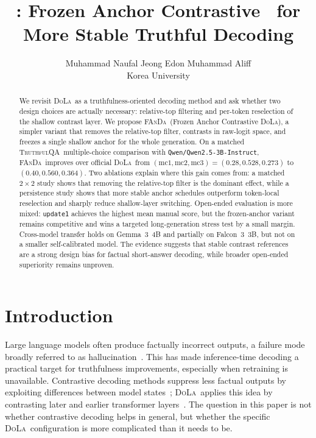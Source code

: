 \documentclass[10pt,twocolumn,letterpaper]{article}
\title{\fanda: Frozen Anchor Contrastive \dola\ for More Stable Truthful Decoding}
\author{Muhammad Naufal \quad Jeong Edon \quad Muhammad Aliff\\
Korea University
}
\newcommand{\fanda}{\textsc{FAnDa}}
\newcommand{\dola}{\textsc{DoLa}}
\newcommand{\truthfulqa}{\textsc{TruthfulQA}}
\begin{document}
\maketitle

\begin{abstract}
We revisit \dola\ as a truthfulness-oriented decoding method and ask whether two design choices are actually necessary: relative-top filtering and per-token reselection of the shallow contrast layer. We propose \fanda\ (Frozen Anchor Contrastive \dola), a simpler variant that removes the relative-top filter, contrasts in raw-logit space, and freezes a single shallow anchor for the whole generation. On a matched \truthfulqa\ multiple-choice comparison with \texttt{Qwen/Qwen2.5-3B-Instruct}, \fanda\ improves over official \dola\ from $(\mathrm{mc1}, \mathrm{mc2}, \mathrm{mc3}) = (0.28, 0.528, 0.273)$ to $(0.40, 0.560, 0.364)$. Two ablations explain where this gain comes from: a matched $2 \times 2$ study shows that removing the relative-top filter is the dominant effect, while a persistence study shows that more stable anchor schedules outperform token-local reselection and sharply reduce shallow-layer switching. Open-ended evaluation is more mixed: \texttt{update1} achieves the highest mean manual score, but the frozen-anchor variant remains competitive and wins a targeted long-generation stress test by a small margin. Cross-model transfer holds on Gemma~3~4B and partially on Falcon~3~3B, but not on a smaller self-calibrated model. The evidence suggests that stable contrast references are a strong design bias for factual short-answer decoding, while broader open-ended superiority remains unproven.
\end{abstract}

\section{Introduction}
Large language models often produce factually incorrect outputs, a failure mode broadly referred to as hallucination~\cite{hallucination}. This has made inference-time decoding a practical target for truthfulness improvements, especially when retraining is unavailable. Contrastive decoding methods suppress less factual outputs by exploiting differences between model states~\cite{contrastive_decoding}; \dola\ applies this idea by contrasting later and earlier transformer layers~\cite{dola}. The question in this paper is not whether contrastive decoding helps in general, but whether the specific \dola\ configuration is more complicated than it needs to be.
\end{document}
